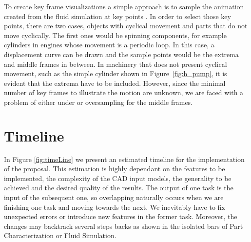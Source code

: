 To create key frame visualizations a simple approach is to sample the animation created from the fluid simulation at key points \cite{Mitra2010}.
In order to select those key points, there are two cases, objects with cyclical movement and parts that do not move cyclically.
The first ones would be spinning components, for example cylinders in engines whose movement is a periodic loop.
In this case, a displacement curve can be drawn and the sample points would be the extrema and middle frames in between.
In machinery that does not present cyclical movement, such as the simple cylinder shown in Figure~\ref{fig:h_pump}, it is evident that the extrema have to be included.
However, since the minimal number of key frames to illustrate the motion are unknown, we are faced with a problem of either under or oversampling for the middle frames.

\section{Timeline}

In Figure \ref{fig:timeLine} we present an estimated timeline for the implementation of the proposal.
This estimation is highly dependant on the features to be implemented, the complexity of the CAD input models, the generality to be achieved and the desired quality of the results.
The output of one task is the input of the subsequent one, so overlapping naturally occurs when we are finishing one task and moving towards the next.
We inevitably have to fix unexpected errors or introduce new features in the former task.
Moreover, the changes may backtrack several steps backs as shown in the isolated bars of Part Characterization or Fluid Simulation.


